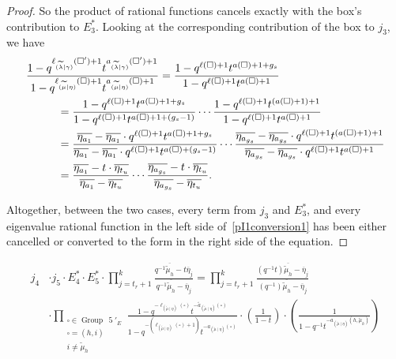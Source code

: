 \documentclass[ALCO]{cedram}
\newcommand{\mutilde}{{\widetilde{\mu}}}
\newcommand{\lambdatilde}{{\widetilde{\lambda}}}
\newcommand{\lambdatildegamma}{{(\lambdatilde \mid \gamma)}}
\newcommand{\mutildeeta}{{(\mutilde \mid \eta)}}
\newcommand{\leg}[1]{{\ell_{#1}(\square)}}
\newcommand{\armone}[1]{{\widetilde{a}_{#1}(\square)}}
\newcommand{\armtwo}[1]{{a_{#1}(\square)}}
\newcommand{\group}[1]{\operatorname{Group}\,\operatorname{#1}}
\newcommand{\jthree}{j_3}
\newcommand{\jfour}{j_4}
\newcommand{\jfive}{j_5}
\newcommand{\Estarthree}{E^*_3}
\newcommand{\Estarfour}{E^*_4}
\newcommand{\Estarfive}{E^*_5}
\begin{document}
\begin{proof}
So the product of rational functions cancels exactly with the box's contribution to $\Estarthree$. Looking at the corresponding contribution of the box to $\jthree$, we have
\begin{align*}
    &\frac{1-q^{\ell_\lambdatildegamma(\square')+1}t^{a_\lambdatildegamma(\square')+1}}{1-q^{\ell_\mutildeeta(\square)+1}t^{a_\mutildeeta(\square)+1}} = \frac{1-q^{\ell(\square)+1}t^{a(\square)+1+g_s}}{1-q^{\ell(\square)+1}t^{a(\square)+1}} \\
    &\hspace*{1cm}= \frac{1-q^{\ell(\square)+1}t^{a(\square)+1+g_s}}{1-q^{\ell(\square)+1}t^{a(\square)+1+(g_s-1)}} \dotsm \frac{1-q^{\ell(\square)+1}t^{(a(\square)+1)+1}}{1-q^{\ell(\square)+1}t^{a(\square)+1}}\\
    &\hspace*{1cm}= \frac{\overline{\eta_{a_1}}-\overline{\eta_{a_1}} \cdot q^{\ell(\square)+1}t^{a(\square)+1+g_s}}{\overline{\eta_{a_1}}-\overline{\eta_{a_1}} \cdot q^{\ell(\square)+1}t^{a(\square)+(g_s-1)}} \dotsm \frac{\overline{\eta_{a_{g_s}}}-\overline{\eta_{a_{g_s}}} \cdot q^{\ell(\square)+1}t^{(a(\square)+1)+1}}{\overline{\eta_{a_{g_s}}}-\overline{\eta_{a_{g_s}}}\cdot q^{\ell(\square)+1}t^{a(\square)+1}}\\
    &\hspace*{1cm}= \frac{\overline{\eta_{a_1}}-t \cdot \overline{\eta_{t_u}}}{\overline{\eta_{a_1}}-\overline{\eta_{t_u}}} \dotsm \frac{\overline{\eta_{a_{g_s}}}-t \cdot \overline{\eta_{t_u}}}{\overline{\eta_{a_{g_s}}}-\overline{\eta_{t_u}}}.
\end{align*}

Altogether, between the two cases, every term from $\jthree$ and $\Estarthree$, and every eigenvalue rational function in the left side of~\eqref{pI1conversion1} has been either cancelled or converted to the form in the right side of the equation.\qedhere

\end{proof}


\begin{prop}\label{prop2conversion}
\begin{equation} \begin{split} \label{PI1conversion2}\jfour& \cdot \jfive \cdot  \Estarfour \cdot \Estarfive \cdot \prod_{j=t_r+1}^k \frac{q^{-1} \overline{\mutilde_h} -t\overline{\eta}_j}{q^{-1} \overline{\mutilde_h} -\overline{\eta}_j} = \prod_{j=t_r+1}^k \frac{(q^{-1}t) \overline{\mutilde_h} -\overline{\eta}_j}{(q^{-1}) \overline{\mutilde_h} -\overline{\eta}_j}  \\ &\cdot \prod\limits_{\substack{\square \in \group{5}'_E \\ \square = (h,i) \\ i\neq \mutilde_h}} \frac{1-q^{-\leg{\mutildeeta}}t^{-\armone{\mutildeeta}}}{1-q^{-(\leg{\mutildeeta}+1)}t^{-\armtwo{\mutildeeta}}} \cdot \left(\frac{1}{1-t}\right) \cdot \left(\frac{1}{1-q^{-1}t^{-a_\mutildeeta(h,\mutilde_h)}}\right)\end{split}\end{equation}
\end{prop}
\end{document}
